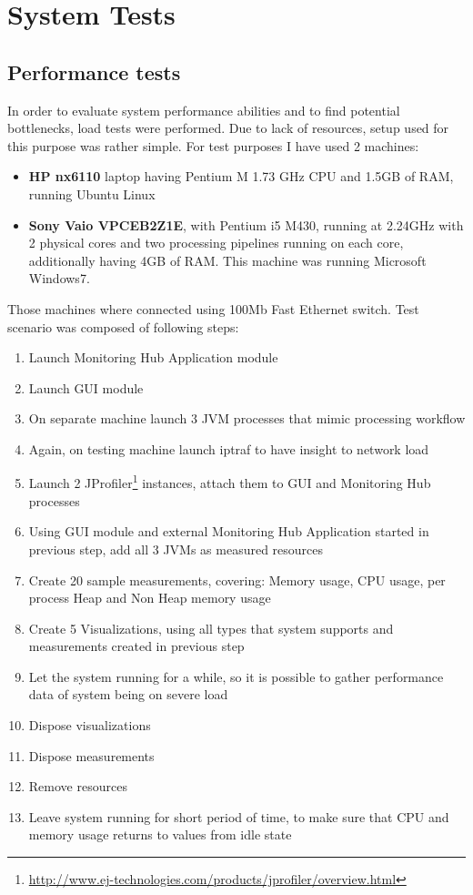 %
\section{System Tests}
\label{sec:tests}
\subsection{Performance tests}

In order to evaluate system performance abilities and to find potential bottlenecks, load tests were performed. Due to lack of resources, setup used for this purpose was rather simple. For test purposes I have used 2 machines: 

\begin{itemize}
\item {\bf HP nx6110} laptop having Pentium M 1.73 GHz CPU and 1.5GB of RAM, running Ubuntu Linux
\item {\bf Sony Vaio VPCEB2Z1E}, with Pentium i5 M430, running at 2.24GHz with 2 physical cores and two processing pipelines running on each core, additionally having 4GB of RAM. This machine was running Microsoft Windows7.
\end{itemize}
Those machines where connected using 100Mb Fast Ethernet switch.
Test scenario was composed of following steps:
\begin{enumerate}
\item Launch Monitoring Hub Application module
\item Launch GUI module
\item On separate machine launch 3 JVM processes that mimic processing workflow
\item Again, on testing machine launch iptraf to have insight to network load
\item Launch 2 JProfiler\footnote{\url{http://www.ej-technologies.com/products/jprofiler/overview.html}} instances, attach them to GUI and Monitoring Hub processes
\item Using GUI module and external Monitoring Hub Application started in previous step, add all 3 JVMs as measured resources
\item Create 20 sample measurements, covering: Memory usage, CPU usage, per process Heap and Non Heap memory usage
\item Create 5 Visualizations, using all types that system supports and measurements created in previous step
\item Let the system running for a while, so it is possible to gather performance data of system being on severe load
\item Dispose visualizations
\item Dispose measurements
\item Remove resources
\item Leave system running for short period of time, to make sure that CPU and memory usage returns to values from idle state
\end{enumerate}

